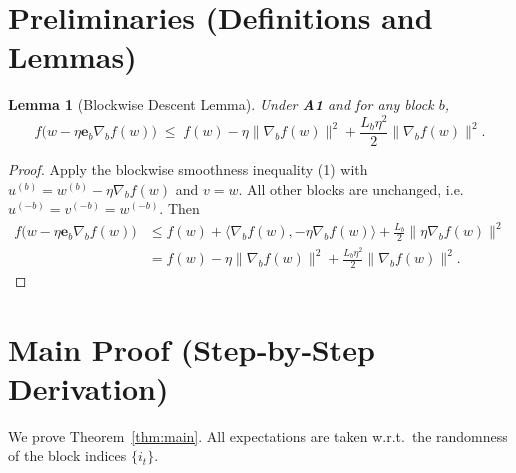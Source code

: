 \documentclass{article}
\newtheorem{lemma}{Lemma}
\begin{document}
\newpage
\section*{Preliminaries (Definitions and Lemmas)}
\begin{lemma}[Blockwise Descent Lemma]\label{lem:descent}
Under \textbf{A1} and for any block $b$,
\[
f\big(w - \eta \mathbf{e}_{b}\nabla_{b}f(w)\big)
\;\le\;
f(w) - \eta\big\|\nabla_{b}f(w)\big\|^{2}
+\frac{L_{b}\eta^{2}}{2}\big\|\nabla_{b}f(w)\big\|^{2}.
\tag{4}
\]
\end{lemma}
\begin{proof}
Apply the blockwise smoothness inequality (1) with  
$u^{(b)} = w^{(b)}-\eta\nabla_{b}f(w)$ and $v=w$.  
All other blocks are unchanged, i.e. $u^{(-b)}=v^{(-b)}=w^{(-b)}$.  
Then
\[
\begin{aligned}
f\big(w-\eta\mathbf{e}_{b}\nabla_{b}f(w)\big)
&\le f(w) + \langle \nabla_{b}f(w), -\eta\nabla_{b}f(w)\rangle
   +\frac{L_{b}}{2}\|\eta\nabla_{b}f(w)\|^{2}\\
&= f(w) -\eta\|\nabla_{b}f(w)\|^{2}
   +\frac{L_{b}\eta^{2}}{2}\|\nabla_{b}f(w)\|^{2}.
\end{aligned}
\]
\end{proof}

\section*{Main Proof (Step‑by‑Step Derivation)}
We prove Theorem~\ref{thm:main}. All expectations are taken w.r.t.\ the randomness of the block indices $\{i_{t}\}$.
\end{document}
